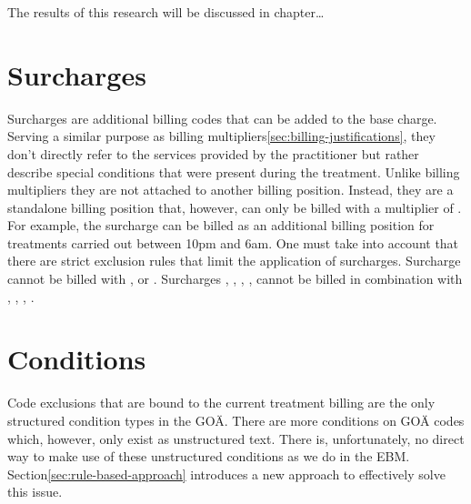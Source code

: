 The results of this research will be discussed in chapter\ldots


\section{Surcharges}\label{sec:surcharges}
Surcharges are additional billing codes that can be added to the base charge.
Serving a similar purpose as billing multipliers\ref{sec:billing-justifications}, they don't directly refer to the services provided by the practitioner but rather describe special conditions that were present during the treatment\cite{walter2008abrechnung}.
Unlike billing multipliers they are not attached to another billing position.
Instead, they are a standalone billing position that, however, can only be billed with a multiplier of .
For example, the surcharge  can be billed as an additional billing position for treatments carried out between 10pm and 6am.
One must take into account that there are strict exclusion rules that limit the application of surcharges\cite{kommentar2012zuschlage}.
Surcharge  cannot be billed with ,  or .
Surcharges , , , ,  cannot be billed in combination with , , , \cite{kommentar2012zuschlage}.

\section{Conditions}\label{sec:goae-conditions}
Code exclusions that are bound to the current treatment billing are the only structured condition types in the GOÄ.
There are more conditions on GOÄ codes which, however, only exist as unstructured text.
There is, unfortunately, no direct way to make use of these unstructured conditions as we do in the EBM.
Section\ref{sec:rule-based-approach} introduces a new approach to effectively solve this issue.